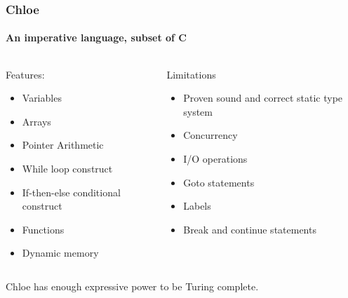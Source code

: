\begin{frame}
\frametitle{Chloe}
\framesubtitle{An imperative language, subset of C}

\begin{columns}[t]
\begin{block}{Features:}
\pause
\begin{itemize}
\item{Variables}
\pause
\item{Arrays}
\pause
\item{Pointer Arithmetic}
\pause
\item{While loop construct}
\pause
\item{If-then-else conditional construct}
\pause
\item{Functions}
\pause
\item{Dynamic memory}
\pause
\end{itemize}
\end{block}
\begin{block}{Limitations}
\begin{itemize}
\pause
\item{Proven sound and correct static type system}
\pause
\item{Concurrency}
\pause
\item{I/O operations}
\pause
\item{Goto statements}
\pause
\item{Labels}
\pause
\item{Break and continue statements}
\end{itemize}
\pause
\end{block}
\end{columns}

Chloe has enough expressive power to be Turing complete.

\end{frame}

